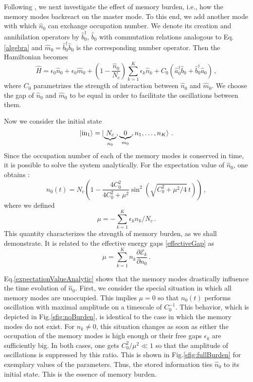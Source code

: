 \documentclass[aps,prd,reprint,superscriptaddress,nofootinbib]{revtex4-2}
\makeatletter
\newcommand*{\fig}{Fig.\@\xspace}
\newcommand*{\Eq}{Eq.\@\xspace}
\makeatother
\begin{document}
Following \cite{1810.02336, 1812.08749}, we next investigate the effect of memory burden, i.e., how the memory modes backreact on the master mode. 
To this end, we add another mode with which $\hat{n}_0$ can exchange occupation number. We denote its creation and annihilation operators by $\hat{b}_0^\dagger$, $\hat{b}_0$ with commutation relations analogous to \Eq \eqref{algebra} and $\hat{m}_0 = \hat{b}_0^\dagger \hat{b}_0$ is the corresponding number operator. Then the Hamiltonian becomes 
\begin{equation} \label{HamiltonianBandA}
\hat{H} = \epsilon_0 \hat{n}_0 + \epsilon_0 \hat{m}_0 +  \left(1-\frac{\hat{n}_0}{N_c}\right) \sum_{k =1}^K \epsilon_k \hat{n}_k +  C_0\left( \hat{a}_0^\dagger \hat{b}_0 + \hat{b}_0^\dagger \hat{a}_0\right)   \,,
\end{equation}
where $C_0$ parametrizes the strength of interaction between $\hat{n}_0$ and $\hat{m}_0$. We choose the gap of $\hat{n}_0$ and $\hat{m}_0$ to be equal in order to facilitate the oscillations between them.

Now we consider the initial state
\begin{equation}
\ket{\text{in}_1} = \ket{\underbrace{N_c}_{n_0}, \underbrace{0}_{m_0}, n_1, \ldots, n_K} \,.
\end{equation} 
Since the occupation number of each of the memory modes is conserved in time, it is possible to solve the system analytically. For the expectation 
value of $\hat{n}_0$, one obtains \cite{1810.02336}: 
\begin{equation} \label{expectationValueAnalytic}
n_0(t) = N_c\left(1- \frac{4C_0^2}{4C_0^2 + \mu^2} \sin^2(\sqrt{C_0^2 + 
\mu^2/4} \, t)\right) \,,
\end{equation} 
where we defined
\begin{equation} \label{memoryBurden}
\mu = -\sum_{k =1}^K \epsilon_k n_k/N_c \,.
\end{equation}
This quantity characterizes the strength of memory burden, as we shall demonstrate. It is related to the effective energy gaps \eqref{effectiveGap} as 
\begin{equation}
	\mu = \sum_{k =1}^K n_k \frac{\partial  \mathcal{E}_k}{\partial n_0} 
\,.
\end{equation}


\Eq \eqref{expectationValueAnalytic} shows that the memory modes drastically influence the time evolution of $\hat{n}_0$. First, we consider the special situation in which all memory modes are unoccupied. This implies $\mu = 0$ so that $n_0(t)$ performs oscillation with maximal amplitude on a timescale of $C_0^{-1}$. This behavior, which is depicted in \fig \ref{sfig:noBurden}, is identical to the case in which the memory modes do not exist. For $n_k \neq 0$, this situation changes as soon as  either the 
occupation of the memory modes is high enough or their free gaps $\epsilon_k$ are sufficiently big. In both cases, one gets $C_0^2/\mu^2 \ll 1$ so 
that the amplitude of oscillations is suppressed by this ratio. This is shown in \fig \ref{sfig:fullBurden} for exemplary values of the parameters. Thus, the stored information ties $\hat{n}_0$ to its initial state. This is the essence of memory burden.
\end{document}
